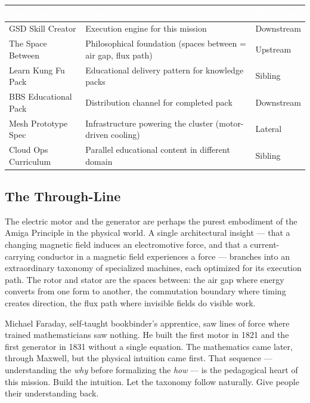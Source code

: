 \documentclass[11pt,letterpaper]{article}
\newcommand{\tableheader}[1]{\textbf{\sffamily\textcolor{white}{#1}}}
\begin{document}
\begin{center}
\begin{tabularx}{\textwidth}{L{4cm}XC{2.5cm}}
\toprule
{}
\tableheader{Document} & \tableheader{Relationship} & \tableheader{Direction} \\
\midrule
GSD Skill Creator & Execution engine for this mission & Downstream \\
The Space Between & Philosophical foundation (spaces between = air gap, flux path) & Upstream \\
Learn Kung Fu Pack & Educational delivery pattern for knowledge packs & Sibling \\
BBS Educational Pack & Distribution channel for completed pack & Downstream \\
Mesh Prototype Spec & Infrastructure powering the cluster (motor-driven cooling) & Lateral \\
Cloud Ops Curriculum & Parallel educational content in different domain & Sibling \\
\bottomrule
\end{tabularx}
\end{center}

\subsection{The Through-Line}

The electric motor and the generator are perhaps the purest embodiment of the Amiga Principle in the physical world. A single architectural insight --- that a changing magnetic field induces an electromotive force, and that a current-carrying conductor in a magnetic field experiences a force --- branches into an extraordinary taxonomy of specialized machines, each optimized for its execution path. The rotor and stator are the spaces between: the air gap where energy converts from one form to another, the commutation boundary where timing creates direction, the flux path where invisible fields do visible work.

Michael Faraday, self-taught bookbinder's apprentice, saw lines of force where trained mathematicians saw nothing. He built the first motor in 1821 and the first generator in 1831 without a single equation. The mathematics came later, through Maxwell, but the physical intuition came first. That sequence --- understanding the \emph{why} before formalizing the \emph{how} --- is the pedagogical heart of this mission. Build the intuition. Let the taxonomy follow naturally. Give people their understanding back.
\end{document}
